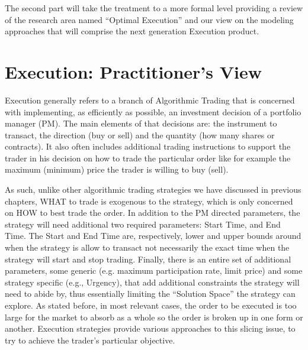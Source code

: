 The second part will take the treatment to a more formal level providing a review of  the research area named ``Optimal Execution'' and our view on the modeling approaches that will comprise the next generation Execution product.



\section{Execution: Practitioner's View}

Execution generally refers to a branch of Algorithmic Trading that is concerned with  implementing, as efficiently as possible, an investment decision of a portfolio manager (PM). The main elements of that decisions are: the instrument to transact, the direction (buy or sell) and the quantity (how many shares or contracts). It also often includes additional trading instructions to support the trader in his decision on how to trade the particular order like for example the maximum (minimum) price the trader is willing to buy (sell). 


As such, unlike other algorithmic trading strategies we have discussed in previous chapters, WHAT to trade is exogenous to the strategy, which is only concerned on HOW to best trade the order. In addition to the PM directed parameters, the strategy will need additional  two required parameters: Start Time, and End Time. The Start and End Time are, respectively, lower and upper bounds around when the strategy is allow to transact not necessarily the exact time when the strategy will start and stop trading. Finally, there is an entire set of additional parameters, some generic (e.g. maximum participation rate, limit price) and some strategy specific (e.g., Urgency), that add additional constraints the strategy will need to abide by, thus essentially limiting the ``Solution Space'' the strategy can explore. As stated before, in most relevant cases, the order to be executed is too large for the market to absorb as a whole so the order is broken up in one form or another. Execution strategies provide various approaches to this slicing issue, to try to achieve the trader's particular objective.


